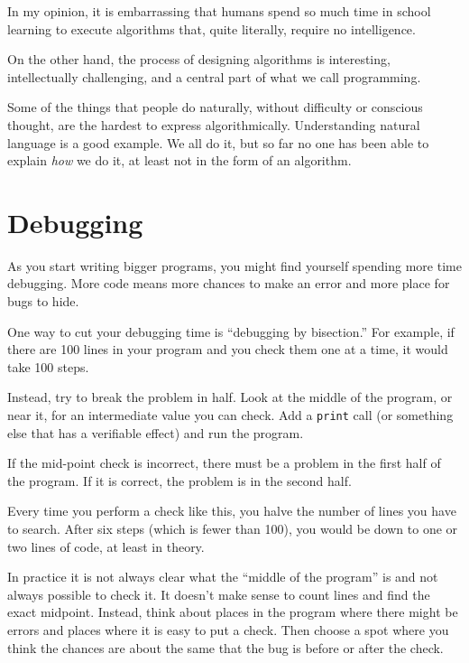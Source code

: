 \documentclass[10pt]{book}
\begin{document}
In my opinion, it is embarrassing that humans spend so much time in
school learning to execute algorithms that, quite literally, require
no intelligence.

On the other hand, the process of designing algorithms is interesting,
intellectually challenging, and a central part of what we call
programming.

Some of the things that people do naturally, without difficulty or
conscious thought, are the hardest to express algorithmically.
Understanding natural language is a good example.  We all do it, but
so far no one has been able to explain {\em how} we do it, at least
not in the form of an algorithm.


\section{Debugging}

As you start writing bigger programs, you might find yourself
spending more time debugging.  More code means more chances to
make an error and more place for bugs to hide.


One way to cut your debugging time is ``debugging by bisection.''
For example, if there are 100 lines in your program and you
check them one at a time, it would take 100 steps.

Instead, try to break the problem in half.  Look at the middle
of the program, or near it, for an intermediate value you
can check.  Add a {\tt print} call (or something else
that has a verifiable effect) and run the program.

If the mid-point check is incorrect, there must be a problem in the
first half of the program.  If it is correct, the problem is
in the second half.

Every time you perform a check like this, you halve the number of
lines you have to search.  After six steps (which is fewer than 100),
you would be down to one or two lines of code, at least in theory.

In practice it is not always clear what
the ``middle of the program'' is and not always possible to
check it.  It doesn't make sense to count lines and find the
exact midpoint.  Instead, think about places
in the program where there might be errors and places where it
is easy to put a check.  Then choose a spot where you
think the chances are about the same that the bug is before
or after the check.
\end{document}

